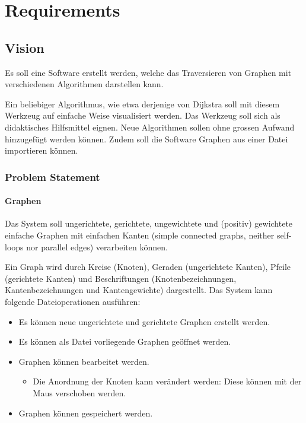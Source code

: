 \chapter{Requirements}
% 
\section{Vision}
\label{sec:Vision}
Es soll eine Software erstellt werden, welche das Traversieren von Graphen mit verschiedenen Algorithmen darstellen kann. 

Ein beliebiger Algorithmus, wie etwa derjenige von Dijkstra soll mit diesem Werkzeug auf einfache Weise visualisiert werden. Das Werkzeug soll sich als didaktisches Hilfsmittel eignen. Neue Algorithmen sollen ohne grossen Aufwand hinzugef\"ugt werden k\"onnen. Zudem soll die Software Graphen aus einer Datei importieren k\"onnen.
% 
\subsection{Problem Statement}
\label{subsec:Problem Statement}
% 
\subsubsection{Graphen}
\label{subsubsec:Graphen}
Das System soll ungerichtete, gerichtete, ungewichtete und (positiv) gewichtete einfache Graphen mit einfachen Kanten (simple connected graphs, neither self-loops nor parallel edges) verarbeiten k\"onnen.

Ein Graph wird durch Kreise (Knoten), Geraden (ungerichtete Kanten), Pfeile (gerichtete Kanten) und Beschriftungen (Knotenbezeichnungen, Kantenbezeichnungen und Kantengewichte) dargestellt. Das System kann folgende Dateioperationen ausf\"uhren:
\begin{itemize}
  \item Es k\"onnen neue ungerichtete und gerichtete Graphen erstellt werden.
  \item Es k\"onnen als Datei vorliegende Graphen ge\"offnet werden.
  \item Graphen k\"onnen bearbeitet werden.
  \begin{itemize}
    \item Die Anordnung der Knoten kann ver\"andert werden: Diese k\"onnen mit der Maus verschoben werden.
  \end{itemize}
  \item Graphen k\"onnen gespeichert werden.
\end{itemize}
% 
